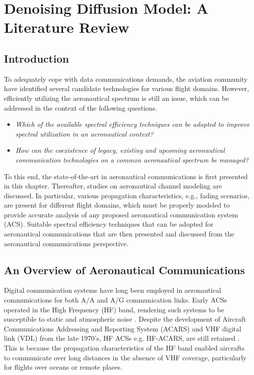 \chapter{Denoising Diffusion Model: A Literature Review}
\label{chap:lit_review}
\section{Introduction}
To adequately cope with data communications demands, the aviation community have identified several candidate technologies for various flight domains. However, efficiently utilizing the aeronautical spectrum is still an issue, which can be addressed in the context of the following questions.

\begin{itemize}
	\item \textit{Which of the available spectral efficiency techniques can be adopted to improve spectral utilization in an aeronautical context?}
	\item \textit{How can the coexistence of legacy, existing and upcoming aeronautical communication technologies on a common aeronautical spectrum be managed?}
\end{itemize}

To this end, the state-of-the-art in aeronautical communications is first presented in this chapter. Thereafter, studies on aeronautical channel modeling are discussed. In particular, various propagation characteristics, e.g., fading scenarios, are present for different flight domains, which must be properly modeled to provide accurate analysis of any proposed aeronautical communication system (ACS). Suitable spectral efficiency techniques that can be adopted for aeronautical communications that are then presented and discussed from the aeronautical communications perspective.


\section{An Overview of Aeronautical Communications}
Digital communication systems have long been employed in aeronautical communications for both A/A and A/G communication links. Early ACSs operated in the High Frequency (HF) band, rendering such systems to be susceptible to static and atmospheric noise \cite{stacey2008aeronautical}. Despite the development of Aircraft Communications Addressing and Reporting System (ACARS) and VHF digital link (VDL) from the late 1970's, HF ACSs e.g. HF-ACARS, are still retained \cite{stacey2008aeronautical}. This is because the propagation characteristics of the HF band enabled aircrafts to communicate over long distances in the absence of VHF coverage, particularly for flights over oceans or remote places. 

